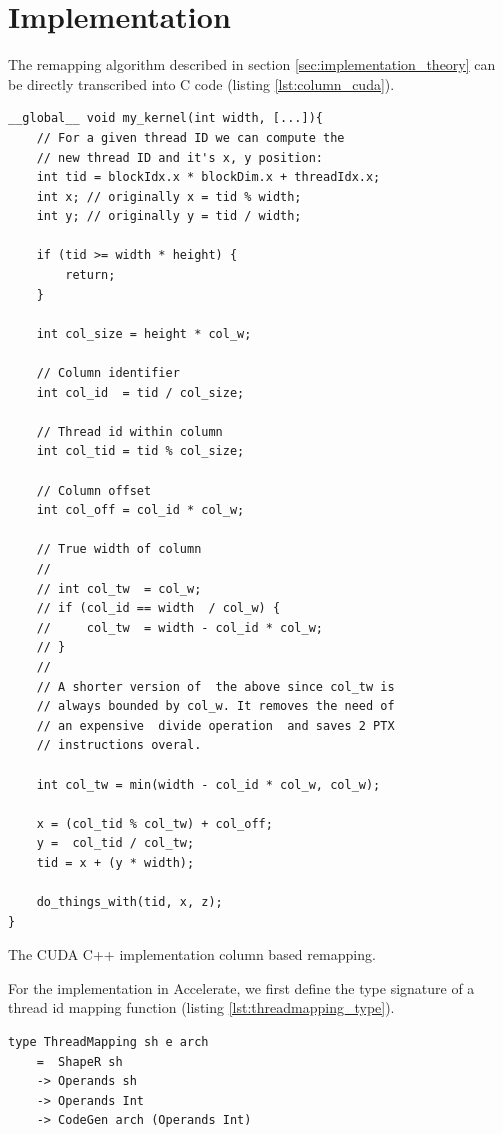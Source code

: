 \section{Implementation}

The remapping algorithm described in section \ref{sec:implementation_theory} can be directly transcribed into C code (listing \ref{lst:column_cuda}).
\begin{listing}[h]
    \begin{verbatim}
__global__ void my_kernel(int width, [...]){
    // For a given thread ID we can compute the 
    // new thread ID and it's x, y position:
    int tid = blockIdx.x * blockDim.x + threadIdx.x;
    int x; // originally x = tid % width;
    int y; // originally y = tid / width;

    if (tid >= width * height) {
        return;
    }

    int col_size = height * col_w;

    // Column identifier
    int col_id  = tid / col_size;

    // Thread id within column
    int col_tid = tid % col_size;

    // Column offset
    int col_off = col_id * col_w;

    // True width of column
    //
    // int col_tw  = col_w;
    // if (col_id == width  / col_w) {
    //     col_tw  = width - col_id * col_w;
    // }
    //
    // A shorter version of  the above since col_tw is 
    // always bounded by col_w. It removes the need of 
    // an expensive  divide operation  and saves 2 PTX
    // instructions overal. 
    
    int col_tw = min(width - col_id * col_w, col_w);

    x = (col_tid % col_tw) + col_off;
    y =  col_tid / col_tw;
    tid = x + (y * width);

    do_things_with(tid, x, z);
}
    \end{verbatim}
    \caption{
        The CUDA C++ implementation column based remapping.
    }
    \label{lst:column_cuda}
\end{listing}
For the implementation in Accelerate, we first define the type signature of a thread id mapping function (listing {\ref{lst:threadmapping_type}}).
\begin{listing}[!ht]
    \begin{verbatim}    
type ThreadMapping sh e arch 
    =  ShapeR sh 
    -> Operands sh 
    -> Operands Int 
    -> CodeGen arch (Operands Int)
    \end{verbatim}
    \caption{
    }
    \label{lst:threadmapping_type}
\end{listing}
